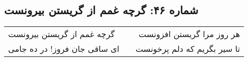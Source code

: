 \begin{center}
\section*{شماره ۴۶: گرچه غمم از گریستن بیرونست}
\label{sec:046}
\begin{longtable}{l p{0.5cm} r}
گرچه غمم از گریستن بیرونست
&&
هر روز مرا گریستن افزونست
\\
ای ساقی جان فروز! در ده جامی
&&
تا سیر بگریم که دلم پرخونست
\\
\end{longtable}
\end{center}
